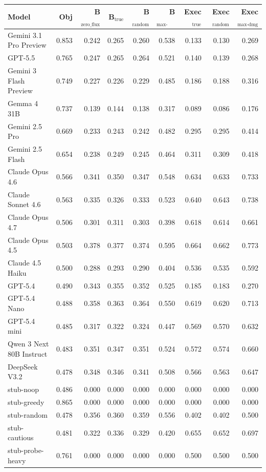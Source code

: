 \begin{tabular}{lrrrrrrrr}
\toprule
Model & Obj & B$_{\text{zero\_flux}}$ & B$_{\text{true}}$ & B$_{\text{random}}$ & B$_{\text{max-dmg}}$ & Exec$_{\text{true}}$ & Exec$_{\text{random}}$ & Exec$_{\text{max-dmg}}$ \\
\midrule
Gemini 3.1 Pro Preview & 0.853 & 0.242 & 0.265 & 0.260 & 0.538 & 0.133 & 0.130 & 0.269 \\
GPT-5.5 & 0.765 & 0.247 & 0.265 & 0.264 & 0.521 & 0.140 & 0.139 & 0.268 \\
Gemini 3 Flash Preview & 0.749 & 0.227 & 0.226 & 0.229 & 0.485 & 0.186 & 0.188 & 0.316 \\
Gemma 4 31B & 0.737 & 0.139 & 0.144 & 0.138 & 0.317 & 0.089 & 0.086 & 0.176 \\
Gemini 2.5 Pro & 0.669 & 0.233 & 0.243 & 0.242 & 0.482 & 0.295 & 0.295 & 0.414 \\
Gemini 2.5 Flash & 0.654 & 0.238 & 0.249 & 0.245 & 0.464 & 0.311 & 0.309 & 0.418 \\
Claude Opus 4.6 & 0.566 & 0.341 & 0.350 & 0.347 & 0.548 & 0.634 & 0.633 & 0.733 \\
Claude Sonnet 4.6 & 0.563 & 0.335 & 0.326 & 0.333 & 0.523 & 0.640 & 0.643 & 0.738 \\
Claude Opus 4.7 & 0.506 & 0.301 & 0.311 & 0.303 & 0.398 & 0.618 & 0.614 & 0.661 \\
Claude Opus 4.5 & 0.503 & 0.378 & 0.377 & 0.374 & 0.595 & 0.664 & 0.662 & 0.773 \\
Claude 4.5 Haiku & 0.500 & 0.288 & 0.293 & 0.290 & 0.404 & 0.536 & 0.535 & 0.592 \\
GPT-5.4 & 0.490 & 0.343 & 0.355 & 0.352 & 0.525 & 0.185 & 0.183 & 0.270 \\
GPT-5.4 Nano & 0.488 & 0.358 & 0.363 & 0.364 & 0.550 & 0.619 & 0.620 & 0.713 \\
GPT-5.4 mini & 0.485 & 0.317 & 0.322 & 0.324 & 0.447 & 0.569 & 0.570 & 0.632 \\
Qwen 3 Next 80B Instruct & 0.483 & 0.351 & 0.347 & 0.351 & 0.524 & 0.572 & 0.574 & 0.660 \\
DeepSeek V3.2 & 0.478 & 0.348 & 0.346 & 0.341 & 0.508 & 0.566 & 0.563 & 0.647 \\
stub-noop & 0.486 & 0.000 & 0.000 & 0.000 & 0.000 & 0.000 & 0.000 & 0.000 \\
stub-greedy & 0.865 & 0.000 & 0.000 & 0.000 & 0.000 & 0.000 & 0.000 & 0.000 \\
stub-random & 0.478 & 0.356 & 0.360 & 0.359 & 0.556 & 0.402 & 0.402 & 0.500 \\
stub-cautious & 0.481 & 0.322 & 0.336 & 0.329 & 0.420 & 0.655 & 0.652 & 0.697 \\
stub-probe-heavy & 0.761 & 0.000 & 0.000 & 0.000 & 0.000 & 0.500 & 0.500 & 0.500 \\
\bottomrule
\end{tabular}
